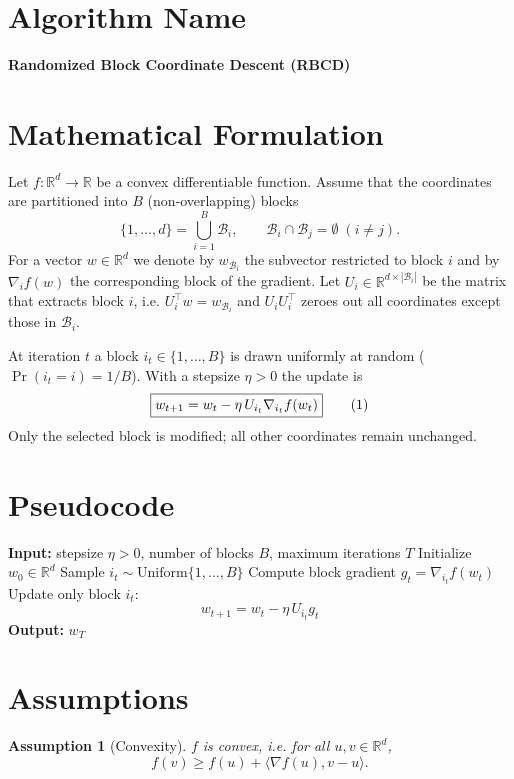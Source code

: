 \documentclass{article}
\newtheorem{assumption}{Assumption}
\newcommand{\R}{\mathbb{R}}
\newcommand{\ip}[2]{\langle #1 , #2\rangle}
\newcommand{\block}[1]{U_{#1}}
\begin{document}
\section*{Algorithm Name}
\textbf{Randomized Block Coordinate Descent (RBCD)}

\section*{Mathematical Formulation}
Let $f:\R^{d}\rightarrow\R$ be a convex differentiable function.  
Assume that the coordinates are partitioned into $B$ (non‑overlapping) blocks
\[
\{1,\dots ,d\}= \bigcup_{i=1}^{B}\mathcal{B}_{i},\qquad
\mathcal{B}_{i}\cap \mathcal{B}_{j}=\emptyset\;(i\neq j).
\]
For a vector $w\in\R^{d}$ we denote by $w_{\mathcal{B}_{i}}$ the subvector restricted to block $i$ and by
$\nabla_{i}f(w)$ the corresponding block of the gradient.
Let $\block{i}\in\R^{d\times |\mathcal{B}_{i}|}$ be the matrix that extracts block $i$,
i.e. $\block{i}^{\top}w = w_{\mathcal{B}_{i}}$ and $\block{i}\block{i}^{\top}$ zeroes out all coordinates except those in $\mathcal{B}_{i}$.

At iteration $t$ a block $i_{t}\in\{1,\dots ,B\}$ is drawn uniformly at random
($\Pr(i_{t}=i)=1/B$).  With a stepsize $\eta>0$ the update is
\[
\boxed{%
w_{t+1}= w_{t}-\eta\,\block{i_{t}}\nabla_{i_{t}} f(w_{t}) } \tag{1}
\]
Only the selected block is modified; all other coordinates remain unchanged.

\section*{Pseudocode}
\begin{algorithm}[H]
\caption{Randomized Block Coordinate Descent}
\begin{algorithmic}[1]
\State \textbf{Input:} stepsize $\eta>0$, number of blocks $B$, maximum iterations $T$
\State Initialize $w_{0}\in\R^{d}$
    \State Sample $i_{t}\sim\text{Uniform}\{1,\dots ,B\}$
    \State Compute block gradient $g_{t}= \nabla_{i_{t}} f(w_{t})$
    \State Update only block $i_{t}$:
    \[
        w_{t+1}= w_{t}-\eta\,\block{i_{t}} g_{t}
    \]
\EndFor
\State \textbf{Output:} $w_{T}$
\end{algorithmic}
\end{algorithm}

\section*{Assumptions}
\begin{assumption}[Convexity]\label{as:convex}
$f$ is convex, i.e. for all $u,v\in\R^{d}$,
\[
f(v)\ge f(u)+\ip{\nabla f(u)}{v-u}.
\]
\end{assumption}
\end{document}
